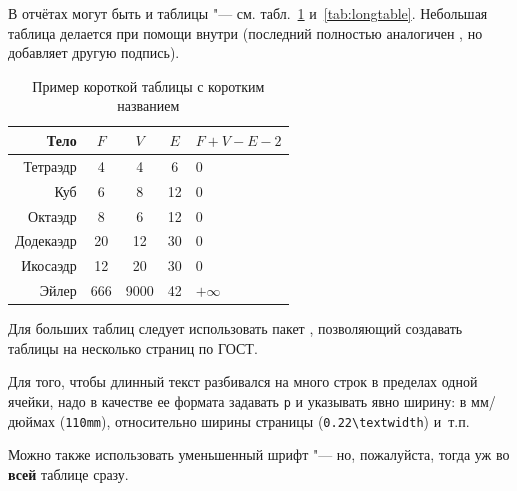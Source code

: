 В отчётах могут быть и таблицы "--- см. табл.~\ref{tab:tabular} и~\ref{tab:longtable}.
Небольшая таблица делается при помощи  внутри  (последний
полностью аналогичен , но добавляет другую подпись).

\begin{table}[ht]
  \caption{Пример короткой таблицы с коротким названием}
  \begin{tabular}{|r|c|c|c|l|}
    \hline
    Тело      & $F$ & $V$  & $E$ & $F+V-E-2$ \\
    \hline
    Тетраэдр  & 4   & 4    & 6   & 0         \\
    Куб       & 6   & 8    & 12  & 0         \\
    Октаэдр   & 8   & 6    & 12  & 0         \\
    Додекаэдр & 20  & 12   & 30  & 0         \\
    Икосаэдр  & 12  & 20   & 30  & 0         \\
    \hline
    Эйлер     & 666 & 9000 & 42  & $+\infty$ \\
    \hline
  \end{tabular}
  \label{tab:tabular}
\end{table}

Для больших таблиц следует использовать пакет , позволяющий создавать
таблицы на несколько страниц по ГОСТ.

Для того, чтобы длинный текст разбивался на много строк в пределах одной ячейки, надо в
качестве ее формата задавать \texttt{p} и указывать явно ширину: в мм/дюймах
(\texttt{110mm}), относительно ширины страницы (\texttt{0.22\textbackslash textwidth})
и~т.п.

Можно также использовать уменьшенный шрифт "--- но, пожалуйста, тогда уж во \textbf{всей}
таблице сразу.

